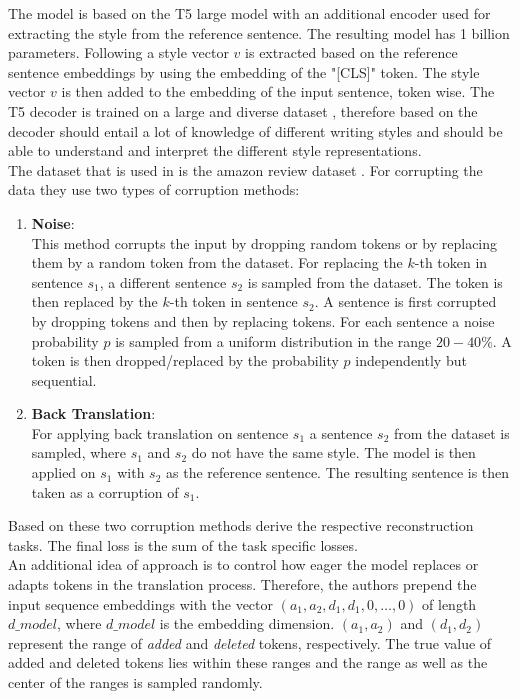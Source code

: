 \documentclass[twocolumn]{tum-article}
\begin{document}
The model is based on the T5 large model with an additional encoder used for extracting the style from the reference sentence. The resulting model has 1 billion parameters. Following \cite{devlin-etal-2019-bert, raffel2019exploring} a style vector $v$ is extracted based on the reference sentence embeddings by using the embedding of the "[CLS]" token. The style vector $v$ is then added to the embedding of the input sentence, token wise. The T5 decoder is trained on a large and diverse dataset \cite{raffel2019exploring}, therefore based on \cite{riley2020textsettr} the decoder should entail a lot of knowledge of different writing styles and should be able to understand and interpret the different style representations.\\
The dataset that is used in \cite{riley2020textsettr} is the amazon review dataset \cite{li2018delete}. For corrupting the data they use two types of corruption methods:
\begin{enumerate}
\item \textbf{Noise}:\\
This method corrupts the input by dropping random tokens or by replacing them by a random token from the dataset. For replacing the $k$-th token in sentence $s_1$, a different sentence $s_2$ is sampled from the dataset. The token is then replaced by the $k$-th token in sentence $s_2$. A sentence is first corrupted by dropping tokens and then by replacing tokens. For each sentence a noise probability $p$ is sampled from a uniform distribution in the range $20-40\%$. A token is then dropped/replaced by the probability $p$ independently but sequential.
\item \textbf{Back Translation}:\\
For applying back translation on sentence $s_1$ a sentence $s_2$ from the dataset is sampled, where $s_1$ and $s_2$ do not have the same style. The model is then applied on $s_1$ with $s_2$ as the reference sentence. The resulting sentence is then taken as a corruption of $s_1$. 
\end{enumerate}
Based on these two corruption methods \cite{riley2020textsettr} derive the respective reconstruction tasks. The final loss is the sum of the task specific losses.\\
An additional idea of \cite{riley2020textsettr} approach is to control how eager the model replaces or adapts tokens in the translation process. Therefore, the authors prepend the input sequence embeddings with the vector $(a_1, a_2, d_1, d_1, 0, \dots, 0)$ of length $d\_model$, where $d\_model$ is the embedding dimension. $(a_1, a_2)$ and $(d_1, d_2)$ represent the range of \textit{added} and \textit{deleted} tokens, respectively. The true value of added and deleted tokens lies within these ranges and the range as well as the center of the ranges is sampled randomly.\\
\end{document}
